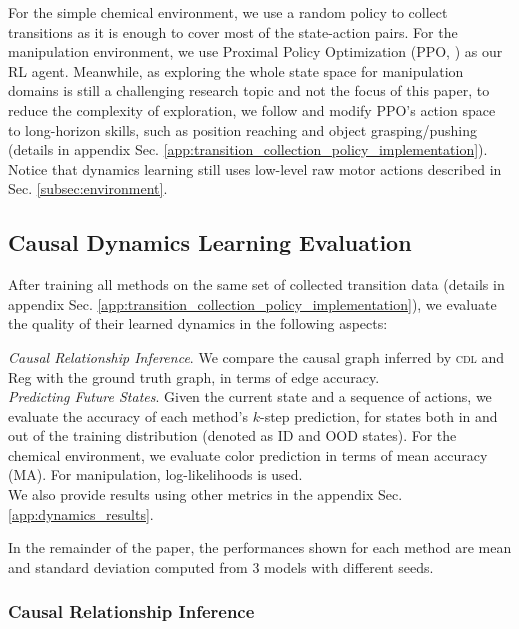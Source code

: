 For the simple chemical environment, we use a random policy to collect transitions as it is enough to cover most of the state-action pairs. For the manipulation environment, we use Proximal Policy Optimization (PPO, \citet{schulman2017proximal}) as our RL agent. Meanwhile, as exploring the whole state space for manipulation domains is still a challenging research topic and not the focus of this paper, to reduce the complexity of exploration, we follow \citet{nasiriany2021maple} and modify PPO's action space to long-horizon skills, such as position reaching and object grasping/pushing (details in appendix Sec. \ref{app:transition_collection_policy_implementation}). Notice that dynamics learning still uses low-level raw motor actions described in Sec. \ref{subsec:environment}.

\subsection{Causal Dynamics Learning Evaluation}
\label{subsec:dynamics_results}

After training all methods on the same set of collected transition data (details in appendix Sec. \ref{app:transition_collection_policy_implementation}), we evaluate the quality of their learned dynamics in the following aspects:

\textit{Causal Relationship Inference}. We compare the causal graph inferred by \textsc{cdl} and Reg with the ground truth graph, in terms of edge accuracy.\\
\textit{Predicting Future States}. Given the current state and a sequence of actions, we evaluate the accuracy of each method's $k$-step prediction, for states both in and out of the training distribution (denoted as ID and OOD states). For the chemical environment, we evaluate color prediction in terms of mean accuracy (MA). For manipulation, log-likelihoods is used.\\
We also provide results using other metrics in the appendix Sec. \ref{app:dynamics_results}.

In the remainder of the paper, the performances shown for each method are mean and standard deviation computed from 3 models with different seeds.

\subsubsection{Causal Relationship Inference}
\label{subsubsec:causal_graph_accuracy_results}

